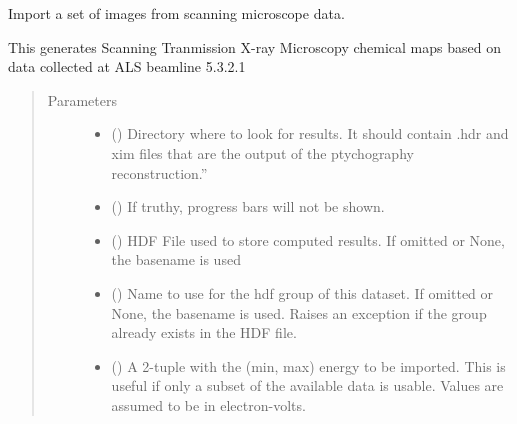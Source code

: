 \documentclass[letterpaper,10pt,english]{sphinxmanual}
\begin{document}

\begin{fulllineitems}
\label{\detokenize{xanespy:xanespy.importers.import_stxm_frameset}}
Import a set of images from scanning microscope data.

This generates Scanning Tranmission X-ray Microscopy chemical maps
based on data collected at ALS beamline 5.3.2.1
\begin{quote}\begin{description}
\item[{Parameters}] \leavevmode\begin{itemize}
\item {} 
 () \textendash{} Directory where to look for results. It should contain .hdr and
xim files that are the output of the ptychography
reconstruction.”

\item {} 
 (\sphinxstyleliteralemphasis{, }) \textendash{} If truthy, progress bars will not be shown.

\item {} 
 (\sphinxstyleliteralemphasis{, }) \textendash{} HDF File used to store computed results. If omitted or None, the
 basename is used

\item {} 
 (\sphinxstyleliteralemphasis{, }) \textendash{} Name to use for the hdf group of this dataset. If omitted or
None, the  basename is used. Raises an exception if
the group already exists in the HDF file.

\item {} 
 (\sphinxstyleliteralemphasis{, }) \textendash{} A 2-tuple with the (min, max) energy to be imported. This is
useful if only a subset of the available data is usable. Values
are assumed to be in electron-volts.


\end{itemize}
\end{description}
\end{quote}
\end{fulllineitems}
\end{document}
